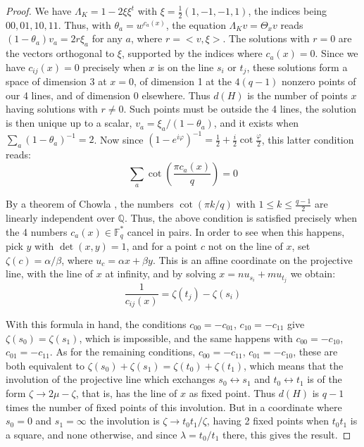 \documentclass[11pt]{amsart}
\theoremstyle{definition}
\begin{document}
\begin{proof}
We have $\Lambda_K=1-2\xi\xi^t$ with $\xi=\frac{1}{2}(1,-1,-1,1)$, the indices being $00,01,10,11$. Thus, with $\theta_a=w^{c_a(x)}$, the equation $\Lambda_Kv=\Theta_xv$ reads $(1-\theta_a)v_a=2r\xi_a$ for any $a$, where $r=<v,\xi>$. The solutions with $r=0$ are the vectors orthogonal to $\xi$, supported by the indices where $c_a(x)=0$. Since we have $c_{ij}(x)=0$ precisely when $x$ is on the line $s_i$ or $t_j$, these solutions form a space of dimension 3 at $x=0$, of dimension 1 at the $4(q-1)$ nonzero points of our 4 lines, and of dimension 0 elsewhere. Thus $d(H)$ is the number of points $x$ having solutions with $r\neq0$. Such points must be outside the 4 lines, the solution is then unique up to a scalar, $v_a=\xi_a/(1-\theta_a)$, and it exists when $\sum_a(1-\theta_a)^{-1}=2$. Now since $(1-e^{i\varphi})^{-1}=\frac{1}{2}+\frac{i}{2}\cot\frac{\varphi}{2}$, this latter condition reads:
$$\sum_a\cot\left(\frac{\pi c_a(x)}{q}\right)=0$$

By a theorem of Chowla \cite{cho}, the numbers $\cot(\pi k/q)$ with $1\leq k\leq\frac{q-1}{2}$ are linearly independent over $\mathbb Q$. Thus, the above condition is satisfied precisely when the 4 numbers $c_a(x)\in\mathbb F_q^*$ cancel in pairs. In order to see when this happens, pick $y$ with $\det(x,y)=1$, and for a point $c$ not on the line of $x$, set $\zeta(c)=\alpha/\beta$, where $u_c=\alpha x+\beta y$. This is an affine coordinate on the projective line, with the line of $x$ at infinity, and by solving $x=nu_{s_i}+mu_{t_j}$ we obtain:
$$\frac{1}{c_{ij}(x)}=\zeta(t_j)-\zeta(s_i)$$

With this formula in hand, the conditions $c_{00}=-c_{01}$, $c_{10}=-c_{11}$ give $\zeta(s_0)=\zeta(s_1)$, which is impossible, and the same happens with $c_{00}=-c_{10}$, $c_{01}=-c_{11}$. As for the remaining conditions, $c_{00}=-c_{11}$, $c_{01}=-c_{10}$, these are both equivalent to $\zeta(s_0)+\zeta(s_1)=\zeta(t_0)+\zeta(t_1)$, which means that the involution of the projective line which exchanges $s_0\leftrightarrow s_1$ and $t_0\leftrightarrow t_1$ is of the form $\zeta\to2\mu-\zeta$, that is, has the line of $x$ as fixed point. Thus $d(H)$ is $q-1$ times the number of fixed points of this involution. But in a coordinate where $s_0=0$ and $s_1=\infty$ the involution is $\zeta\to t_0t_1/\zeta$, having 2 fixed points when $t_0t_1$ is a square, and none otherwise, and since $\lambda=t_0/t_1$ there, this gives the result.
\end{proof}
\end{document}
